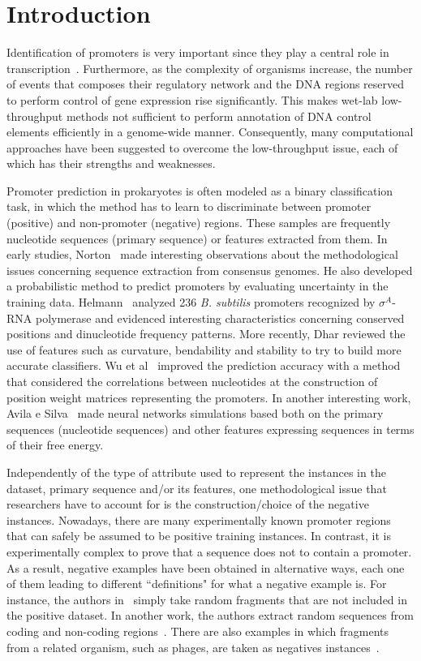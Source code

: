 \documentclass{sig-alternate}
\theoremstyle{plain}
\begin{document}
\section{Introduction}
\label{sec:intro}

Identification of promoters is very important since they play a central role in transcription~\cite{maston2006}. Furthermore, as the complexity of organisms increase, the number of events that composes their regulatory network and the DNA regions reserved to perform control of gene expression rise significantly. This  makes wet-lab low-throughput methods not sufficient to perform annotation of DNA control elements efficiently in a genome-wide manner. Consequently, many computational approaches have been suggested to overcome the low-throughput issue, each of which has their strengths and weaknesses.

Promoter prediction in prokaryotes is often modeled as a binary classification task, in which the method has to learn to discriminate between promoter (positive) and non-promoter  (negative)  regions. These samples are frequently  nucleotide sequences (primary sequence) or features extracted from them. In early studies, Norton~\cite{norton1994} made interesting observations about the methodological issues concerning sequence extraction from consensus genomes. He also developed a probabilistic method to predict promoters by evaluating uncertainty in the training data. Helmann~\cite{helmann1995} analyzed 236 {\it B. subtilis} promoters recognized by ${\sigma }^{{A}}$-RNA polymerase and evidenced interesting characteristics concerning conserved positions and dinucleotide frequency patterns. More recently, Dhar \cite{dhar2010} reviewed the use of features such as curvature, bendability and stability to try to build more accurate  classifiers. Wu et al~\cite{wu2011} improved the prediction accuracy with a method that considered the correlations between nucleotides at the construction of position weight matrices representing the promoters. In another interesting work, Avila e Silva~\cite{avila2011} made neural networks simulations based both on the primary sequences (nucleotide sequences)  and other  features expressing sequences in terms of their free energy.

Independently of the  type of attribute used to represent the instances in the dataset, primary sequence and/or its features, one methodological issue that researchers have to account for is the construction/choice of the negative instances.  Nowadays, there are many experimentally known promoter regions that can safely be assumed to be positive training instances. In contrast,  it is experimentally complex to prove that a sequence does not to contain a promoter. As a result, negative examples have been obtained in alternative ways, each one of them leading to different ``definitions" for what a negative example is. For instance,  the authors in~\cite{bland2010} simply take random fragments that are not included in the positive dataset. In another work, the authors  extract random sequences from coding and non-coding regions~\cite{gordon2003}.  There are also examples in which fragments from a related organism, such as phages, are taken as negatives instances~\cite{towell1993,monteiro2005}. 
\end{document}
